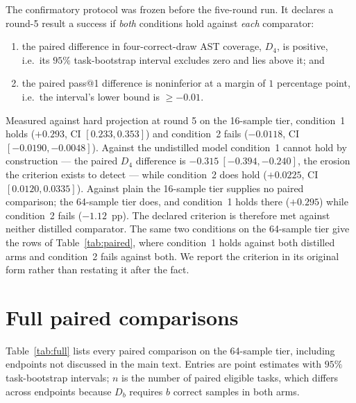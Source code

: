 \documentclass{article}
\begin{document}
The confirmatory protocol was frozen before the five-round run. It declares a round-5 result a success if \emph{both} conditions hold against \emph{each} comparator:
\begin{enumerate}\itemsep2pt
\item the paired difference in four-correct-draw AST coverage, $D_4$, is positive, i.e.\ its $95\%$ task-bootstrap interval excludes zero and lies above it; and
\item the paired pass@1 difference is noninferior at a margin of $1$ percentage point, i.e.\ the interval's lower bound is $\ge -0.01$.
\end{enumerate}
Measured against hard projection at round 5 on the 16-sample tier, condition~1 holds ($+0.293$, CI $[0.233,0.353]$) and condition~2 fails ($-0.0118$, CI $[-0.0190,-0.0048]$). Against the undistilled model condition~1 cannot hold by construction --- the paired $D_4$ difference is $-0.315\ [-0.394,-0.240]$, the erosion the criterion exists to detect --- while condition~2 does hold ($+0.0225$, CI $[0.0120,0.0335]$). Against plain the 16-sample tier supplies no paired comparison; the 64-sample tier does, and condition~1 holds there ($+0.295$) while condition~2 fails ($-1.12$~pp). The declared criterion is therefore met against neither distilled comparator. The same two conditions on the 64-sample tier give the rows of Table~\ref{tab:paired}, where condition~1 holds against both distilled arms and condition~2 fails against both. We report the criterion in its original form rather than restating it after the fact.

\section{Full paired comparisons}
\label{app:full}

Table~\ref{tab:full} lists every paired comparison on the 64-sample tier, including endpoints not discussed in the main text. Entries are point estimates with $95\%$ task-bootstrap intervals; $n$ is the number of paired eligible tasks, which differs across endpoints because $D_b$ requires $b$ correct samples in both arms.
\end{document}
